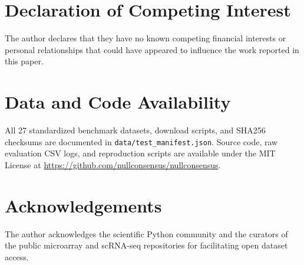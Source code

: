 \documentclass[preprint,12pt]{elsarticle}
\begin{document}
\section*{Declaration of Competing Interest}
The author declares that they have no known competing financial interests or personal relationships that could have appeared to influence the work reported in this paper.

\section*{Data and Code Availability}
All 27 standardized benchmark datasets, download scripts, and SHA256 checksums are documented in \texttt{data/test\_manifest.json}. Source code, raw evaluation CSV logs, and reproduction scripts are available under the MIT License at \url{https://github.com/nullconsensus/nullconsensus}.

\section*{Acknowledgements}
The author acknowledges the scientific Python community and the curators of the public microarray and scRNA-seq repositories for facilitating open dataset access.





\end{document}
